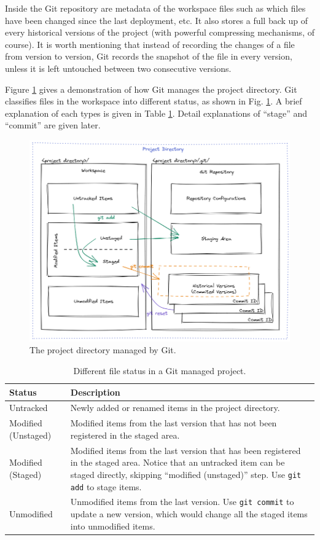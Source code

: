 Inside the Git repository are metadata of the workspace files such as which files have been changed since the last deployment, etc. It also stores a full back up of every historical versions of the project (with powerful compressing mechanisms, of course). It is worth mentioning that instead of recording the changes of a file from version to version, Git records the snapshot of the file in every version, unless it is left untouched between two consecutive versions.

Figure \ref{ch:sma:fig:gitbasics} gives a demonstration of how Git manages the project directory. Git classifies files in the workspace into different status, as shown in Fig. \ref{ch:sma:fig:gitbasics}. A brief explanation of each types is given in Table \ref{ch:sma:tab:gitbasics}. Detail explanations of ``stage'' and ``commit'' are given later.
\begin{figure}[!htb]
	\centering
	\includegraphics[width=350pt]{chapters/part-3/figures/gitbasics.png}
	\caption{The project directory managed by Git.} \label{ch:sma:fig:gitbasics}
\end{figure}

\begin{table}
	\centering \caption{Different file status in a Git managed project.}\label{ch:sma:tab:gitbasics}
	\begin{tabularx}{\textwidth}{lX}
		\hline
		Status & Description \\ \hline
		Untracked & Newly added or renamed items in the project directory.  \\ 
		Modified (Unstaged) & Modified items from the last version that has not been registered in the staged area.  \\ 
		Modified (Staged) & Modified items from the last version that has been registered in the staged area. Notice that an untracked item can be staged directly, skipping ``modified (unstaged)'' step. Use \verb|git add| to stage items. \\ 
		Unmodified & Unmodified items from the last version. Use \verb|git commit| to update a new version, which would change all the staged items into unmodified items. \\ \hline
	\end{tabularx}
\end{table}

